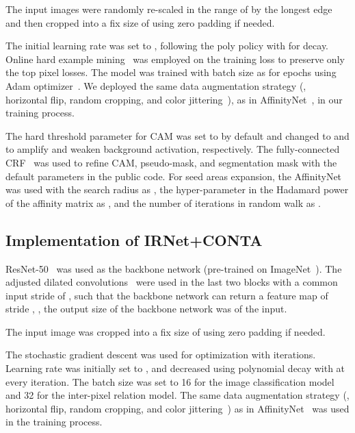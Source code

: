  The input images were randomly re-scaled in the range of  by the longest edge and then cropped into a fix size of  using zero padding if needed.

 The initial learning rate was set to , following the poly policy  with  for decay. Online hard example mining~\cite{shrivastava2016training} was employed on the training loss to preserve only the top  pixel losses. The model was trained with batch size as  for  epochs using Adam optimizer~\cite{kingma2014adam}. We deployed the same data augmentation strategy (\ie, horizontal flip, random cropping, and color jittering~\cite{krizhevsky2012imagenet}), as in AffinityNet~\cite{ahn2018learning}, in our training process.

The hard threshold parameter for CAM was set to  by default and changed to  and  to amplify and weaken background activation, respectively. The fully-connected CRF~\cite{krahenbuhl2011efficient} was used to refine CAM, pseudo-mask, and segmentation mask with the default parameters in the public code. For seed areas expansion, the AffinityNet~\cite{ahn2018learning} was used with the search radius as , the hyper-parameter in the Hadamard power of the affinity matrix as , and the number of iterations in random walk as .



\subsection{Implementation of IRNet+CONTA}
 ResNet-50~\cite{he2016deep} was used as the backbone network (pre-trained on ImageNet~\cite{deng2009imagenet}). The adjusted dilated convolutions~\cite{yu2015multi} were used in the last two blocks with a common input stride of , such that the backbone network can return a feature map of stride , \ie, the output size of the backbone network was  of the input.

 The input image was cropped into a fix size of  using zero padding if needed.

 The stochastic gradient descent was used for optimization with  iterations. Learning rate was initially set to , and decreased using polynomial decay  with  at every iteration. The batch size was set to 16 for the image classification model and 32 for the inter-pixel relation model. The same data augmentation strategy (\ie, horizontal flip, random cropping, and color jittering~\cite{krizhevsky2012imagenet}) as in AffinityNet~\cite{ahn2018learning} was used in the training process.

